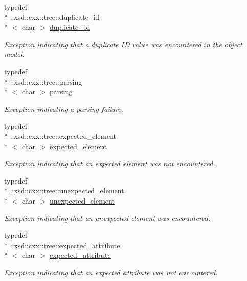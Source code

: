 \begin{DoxyCompactItemize}
typedef \\*
\+::xsd\+::cxx\+::tree\+::duplicate\+\_\+id\\*
$<$ char $>$ \hyperlink{namespacexml__schema_a22a2b3c973b87b06c2868d85a154fd63}{duplicate\+\_\+id}
\begin{DoxyCompactList}\small\item\em Exception indicating that a duplicate I\+D value was encountered in the object model. \end{DoxyCompactList}\item 
typedef \\*
\+::xsd\+::cxx\+::tree\+::parsing\\*
$<$ char $>$ \hyperlink{namespacexml__schema_a150f88d7d2156ae81807b142038684f5}{parsing}
\begin{DoxyCompactList}\small\item\em Exception indicating a parsing failure. \end{DoxyCompactList}\item 
typedef \\*
\+::xsd\+::cxx\+::tree\+::expected\+\_\+element\\*
$<$ char $>$ \hyperlink{namespacexml__schema_a4b608c951db27c574552da0bda062e1a}{expected\+\_\+element}
\begin{DoxyCompactList}\small\item\em Exception indicating that an expected element was not encountered. \end{DoxyCompactList}\item 
typedef \\*
\+::xsd\+::cxx\+::tree\+::unexpected\+\_\+element\\*
$<$ char $>$ \hyperlink{namespacexml__schema_a55835ab195e4c70bc05de5bbac871110}{unexpected\+\_\+element}
\begin{DoxyCompactList}\small\item\em Exception indicating that an unexpected element was encountered. \end{DoxyCompactList}\item 
typedef \\*
\+::xsd\+::cxx\+::tree\+::expected\+\_\+attribute\\*
$<$ char $>$ \hyperlink{namespacexml__schema_ad8a9d3a09372da61ab6ba78c4de87a26}{expected\+\_\+attribute}
\begin{DoxyCompactList}\small\item\em Exception indicating that an expected attribute was not encountered. \end{DoxyCompactList}\item 

\end{DoxyCompactItemize}
